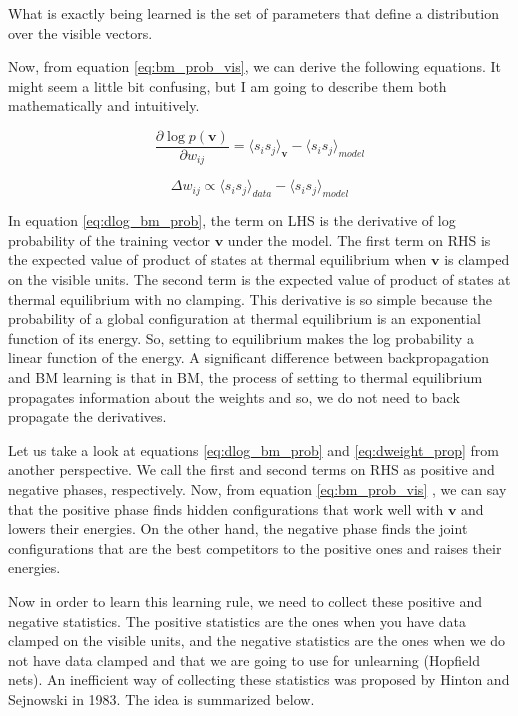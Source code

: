 \documentclass{article}
\begin{document}
What is exactly being learned is the set of parameters that define a distribution over the visible vectors.

Now, from equation \ref{eq:bm_prob_vis}, we can derive the following equations. It might seem a little bit confusing, but I am going to describe them both mathematically and intuitively.

\begin{equation}
\frac{\partial \log p(\mathbf{v})}{\partial w_{ij}} = \langle s_i s_j \rangle_\mathbf{v} -  \langle s_i s_j \rangle_{model}
\label{eq:dlog_bm_prob}
\end{equation}

\begin{equation}
\Delta w_{ij} \propto \langle s_i s_j \rangle_{data} -  \langle s_i s_j \rangle_{model}
\label{eq:dweight_prop}
\end{equation}

In equation \ref{eq:dlog_bm_prob}, the term on LHS is the derivative of log probability of the training vector $\mathbf{v}$ under the model. The first term on RHS is the expected value of product of states at thermal equilibrium when $\mathbf{v}$ is clamped on the visible units. The second term is the expected value of product of states at thermal equilibrium with no clamping. This derivative is so simple because the probability of a global configuration at thermal equilibrium is an exponential function of its energy. So, setting to equilibrium makes the log probability a linear function of the energy. A significant difference between backpropagation and BM learning is that in BM, the process of setting to thermal equilibrium propagates information about the weights and so, we do not need to back propagate the derivatives. 

Let us take a look at equations \ref{eq:dlog_bm_prob} and \ref{eq:dweight_prop} from another perspective. We call the first and second terms on RHS as positive and negative phases, respectively. Now, from equation \ref{eq:bm_prob_vis} , we can say that the positive phase finds hidden configurations that work well with $\mathbf{v}$ and lowers their energies. On the other hand, the negative phase finds the joint configurations that are the best competitors to the positive ones and raises their energies.

Now in order to learn this learning rule, we need to collect these positive and negative statistics. The positive statistics are the ones when you have data clamped on the visible units, and the negative statistics are the ones when we do not have data clamped and that we are going to use for unlearning (Hopfield nets). An inefficient way of collecting these statistics was proposed by Hinton and Sejnowski in 1983. The idea is summarized below. 
\end{document}
